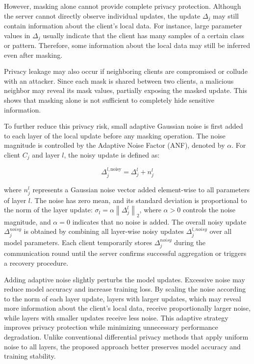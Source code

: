 \documentclass[a4paper,fleqn]{cas-dc}
\begin{document}
However, masking alone cannot provide complete privacy protection. Although the server cannot directly observe individual updates, the update $\Delta_{j}$ may still contain information about the client's local data. For instance, large parameter values in $\Delta_{j}$ usually indicate that the client has many samples of a certain class or pattern. Therefore, some information about the local data may still be inferred even after masking.

Privacy leakage may also occur if neighboring clients are compromised or collude with an attacker. Since each mask is shared between two clients, a malicious neighbor may reveal its mask values, partially exposing the masked update. This shows that masking alone is not sufficient to completely hide sensitive information.

To further reduce this privacy risk, small adaptive Gaussian noise is first added to each layer of the local update before any masking operation. The noise magnitude is controlled by the Adaptive Noise Factor (ANF), denoted by $\alpha$. For client $C_{j}$ and layer $l$, the noisy update is defined as:

\begin{equation}
\Delta_{j}^{l, \mathrm{noisy}} = \Delta_{j}^{l} + n_{j}^{l}
\label{eq:3}
\end{equation}

where $n_{j}^{l}$ represents a Gaussian noise vector added element-wise to all parameters of layer $l$. The noise has zero mean, and its standard deviation is proportional to the norm of the layer update: $\sigma_{l} = \alpha\left\| \Delta_{j}^{l} \right\|_{2}$, where $\alpha > 0$ controls the noise magnitude, and $\alpha = 0$ indicates that no noise is added. The overall noisy update $\Delta_{j}^{noisy}$ is obtained by combining all layer-wise noisy updates $\Delta_{j}^{l, noisy}$ over all model parameters. Each client temporarily stores $\Delta_{j}^{noisy}$ during the communication round until the server confirms successful aggregation or triggers a recovery procedure.

Adding adaptive noise slightly perturbs the model updates. Excessive noise may reduce model accuracy and increase training loss. By scaling the noise according to the norm of each layer update, layers with larger updates, which may reveal more information about the client's local data, receive proportionally larger noise, while layers with smaller updates receive less noise. This adaptive strategy improves privacy protection while minimizing unnecessary performance degradation. Unlike conventional differential privacy methods that apply uniform noise to all layers, the proposed approach better preserves model accuracy and training stability.
\end{document}
